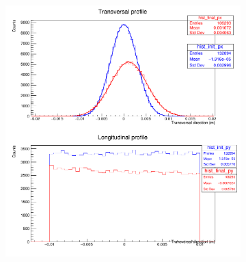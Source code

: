 \begin{figure}[!ht]
  \centering
	\begin{subfigure}{0.8\textwidth}
		
		\caption[]{}
		\label{}
	\end{subfigure}

  \begin{subfigure}{0.8\textwidth}
		\centering
		\includegraphics[width=\textwidth]{03_Prototype/figures/fig022_2IPM_ASYM_NODISK_NODEG_b}
		\caption{}
		\label{}
	\end{subfigure}
	\caption[]{}
	\label{chap:}
\end{figure}
